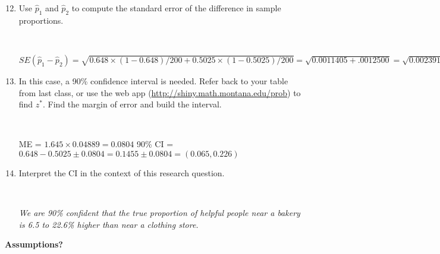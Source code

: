 \begin{enumerate}
  \setcounter{enumi}{11}
  \item Use $ \widehat{p}_1$ and $\widehat{p}_2$ to compute the standard
    error of the difference in sample proportions.
\begin{students}
  \vspace{2cm}\\
\end{students}
\begin{key}
$ SE(\widehat{p}_1 - \widehat{p}_2) = \sqrt{ 0.648\times(1- 0.648)/200
  + 0.5025\times(1-  0.5025)/200} = \sqrt{0.0011405 + .0012500 } =
\sqrt{0.002391 } = 0.04889 $
\end{key}

\item In this case, a 90\% confidence interval is needed.  Refer back
  to your table from last class, or use the web app
  (\url{http://shiny.math.montana.edu/prob}) to find $z^*$.
  Find the margin of error and   build the interval.
\begin{students}
 \vspace{1cm}\\
\end{students}
\begin{key}
ME = $ 1.645 \times 0.04889 = 0.0804 $ 90\% CI =  $0.648 - 0.5025 \pm
0.0804 = 0.1455 \pm 0.0804 = (0.065, 0.226)$
\end{key}

\item Interpret the CI in the context of this research question.
\begin{students}
 \vspace{1cm}\\
\vspace{1in}
\end{students}
\begin{key}
 {\it We are 90\% confident that the true proportion of helpful people
   near a bakery is 6.5 to 22.6\% higher than near a clothing store.}
\end{key}
\end{enumerate}

\begin{center}
  {\large\bf Assumptions?}
\end{center}

